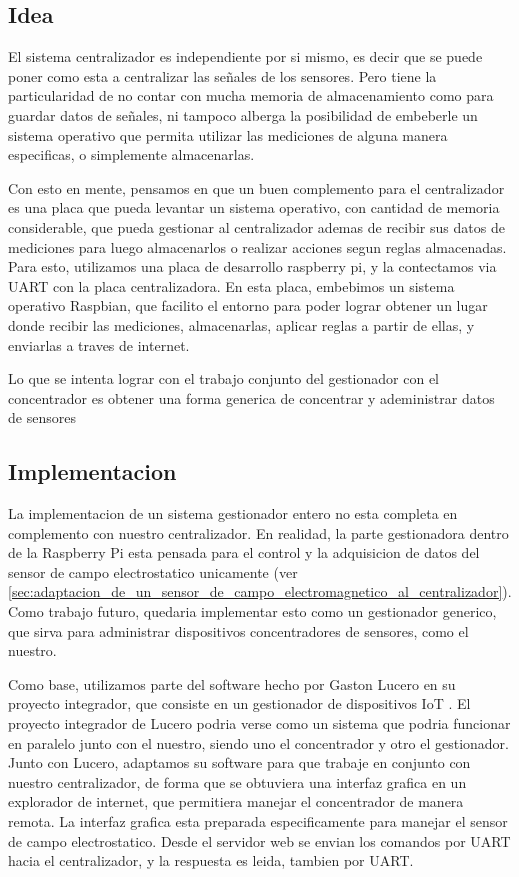 \documentclass[a4paper]{article}
\begin{document}
\subsection{Idea} %
\label{sub:idea}

El sistema centralizador es independiente por si mismo, es decir que se puede poner como esta a centralizar las señales de los sensores. Pero tiene la particularidad de no contar con mucha memoria de almacenamiento como para guardar datos de señales, ni tampoco alberga la posibilidad de embeberle un sistema operativo que permita utilizar las mediciones de alguna manera especificas, o simplemente almacenarlas.

Con esto en mente, pensamos en que un buen complemento para el centralizador es una placa que pueda levantar un sistema operativo, con cantidad de memoria considerable, que pueda gestionar al centralizador ademas de recibir sus datos de mediciones para luego almacenarlos o realizar acciones segun reglas almacenadas. Para esto, utilizamos una placa de desarrollo raspberry pi, y la contectamos via UART con la placa centralizadora. En esta placa, embebimos un sistema operativo Raspbian, que facilito el entorno para poder lograr obtener un lugar donde recibir las mediciones, almacenarlas, aplicar reglas a partir de ellas, y enviarlas a traves de internet.

Lo que se intenta lograr con el trabajo conjunto del gestionador con el concentrador es obtener una forma generica de concentrar y adeministrar datos de sensores


\subsection{Implementacion} %
\label{sub:implementacion}

La implementacion de un sistema gestionador entero no esta completa en complemento con nuestro centralizador. En realidad, la parte gestionadora dentro de la Raspberry Pi esta pensada para el control y la adquisicion de datos del sensor de campo electrostatico unicamente (ver \ref{sec:adaptacion_de_un_sensor_de_campo_electromagnetico_al_centralizador}). Como trabajo futuro, quedaria implementar esto como un gestionador generico, que sirva para administrar dispositivos concentradores de sensores, como el nuestro.

Como base, utilizamos parte del software hecho por Gaston Lucero en su proyecto integrador, que consiste en un gestionador de dispositivos IoT . El proyecto integrador de Lucero podria verse como un sistema que podria funcionar en paralelo junto con el nuestro, siendo uno el concentrador y otro el gestionador. Junto con Lucero, adaptamos su software para que trabaje en conjunto con nuestro centralizador, de forma que se obtuviera una interfaz grafica en un explorador de internet, que permitiera manejar el concentrador de manera remota. La interfaz grafica esta preparada especificamente para manejar el sensor de campo electrostatico. Desde el servidor web se envian los comandos por UART hacia el centralizador, y la respuesta es leida, tambien por UART. 
\end{document}
